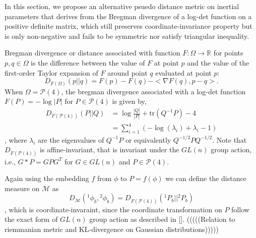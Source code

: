 \documentclass[Afour,sageh,times]{sagej}
\begin{document}
In this section, we propose an alternative psuedo distance metric on inertial parameters that derives from the Bregman divergence of a log-det function on a positive definite matrix, which still preserves coordinate-invariance property but is only non-negative and fails to be symmetric nor satisfy triangular inequality.

Bregman divergence or distance associated with function $F: \Omega\rightarrow \mathbb{R}$ for points $p,q\in\Omega$ is the difference between the value of $F$ at point $p$ and the value of the first-order Taylor expansion of $F$ around point $q$ evaluated at point $p$:
\begin{equation*}
D_{F(\Omega)}(p || q) = F(p)-F(q)-<\nabla F(q), p-q>.
\end{equation*}
When $\Omega = \mathcal{P}(4)$, the bregman divergence associated with a log-det function $F(P) = -\log|P|$ for $P\in\mathcal{P}(4)$ is given by,
\begin{align}
D_{F(\mathcal{P}(4))}(P || Q) &= \log\frac{|Q|}{|P|} + \mathrm{tr}(Q^{-1}P) - 4\\
&= \sum_{i=1}^4(-\log(\lambda_{i})+\lambda_{i}-1)
\end{align}
, where $\lambda_i$ are the eigenvalues of $Q^{-1}P$ or equivalently $Q^{-1/2}PQ^{-1/2}$. Note that $D_{F(\mathcal{P}(4))}$ is affine-invariant, that is invariant under the $GL(n)$ group action, i.e., $G * P = GPG^{T}$ for $G\in GL(n)$ and $P\in\mathcal{P}(4)$.

Again using the embedding $f$ from $\phi$ to $P = f(\phi)$ we can define the distance measure on $\mathcal{M}$ as
\begin{equation}
D_{\mathcal{M}}({^{1}}\phi_{b}, {^{2}}\phi_{b}) = D_{F(\mathcal{P}(4))}({^{1}}P_{b} ||  {^{2}}P_{b}) \label{Bregman_div}
\end{equation}
, which is coordinate-invaraint, since the coordinate transformation on $P$ follow the exact form of $GL(n)$ group action as described in [].
(((((Relation to riemmanian metric and KL-divergence on Gaussian distributions)))))
\end{document}
